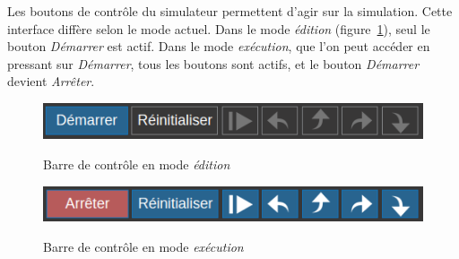 \documentclass{tufte-handout}
\begin{document}
Les boutons de contrôle du simulateur permettent d'agir sur la simulation. 
Cette interface diffère selon le mode actuel. Dans le mode \emph{édition} (figure~\ref{f:controles1}), seul le bouton \textit{Démarrer} est actif. Dans le mode \emph{exécution}, que l'on peut accéder en pressant sur \textit{Démarrer}, tous les boutons sont actifs, et le bouton \textit{Démarrer} devient \textit{Arrêter}. 
\begin{figure}[h!]
\raggedleft
\includegraphics[width=0.8\linewidth]{pics/controles_1b.png}
\label{f:controles1}
\caption{Barre de contrôle en mode \emph{édition}}
\end{figure}
\vspace{-1em}
\begin{figure}[h!]
\raggedleft
\includegraphics[width=0.8\linewidth]{pics/controles_2b.png}
\label{f:controles2}
\caption{Barre de contrôle en mode \emph{exécution}}
\end{figure}
\end{document}
